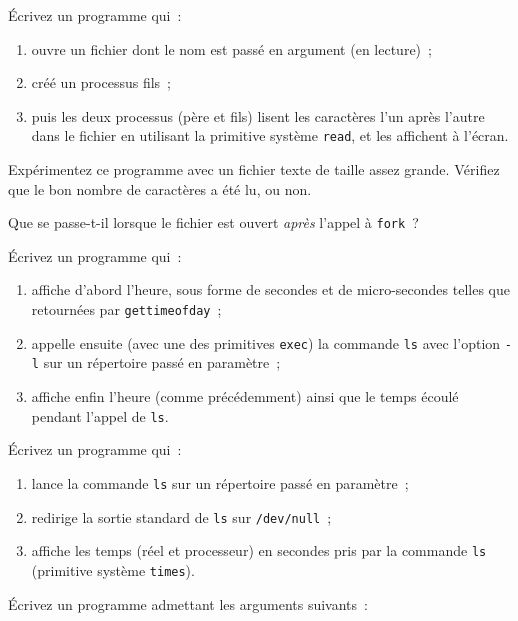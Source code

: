 Écrivez un programme qui~:
\begin {enumerate}
    \item ouvre un fichier dont le nom est passé en argument (en
	lecture)~;
    \item créé un processus fils~;
    \item puis les deux processus (père et fils) lisent les caractères
	l'un après l'autre dans le fichier en utilisant la primitive système
	{\tt read}, et les affichent à l'écran.
\end {enumerate}
Expérimentez ce programme avec un fichier texte de taille assez grande.
Vérifiez que le bon nombre de caractères a été lu, ou non.

Que se passe-t-il lorsque le fichier est ouvert {\em après} l'appel à
{\tt fork}~?


\question

Écrivez un programme qui~:

\begin {enumerate}
    \item affiche d'abord l'heure, sous forme de secondes et de
	micro-secondes telles que retournées par \texttt {gettimeofday}~;

    \item appelle ensuite (avec une des primitives \texttt {exec})
	la commande \texttt {ls} avec l'option \texttt {-l} sur un
	répertoire passé en paramètre~;

    \item affiche enfin l'heure (comme précédemment) ainsi que le
	temps écoulé pendant l'appel de \texttt {ls}.

\end {enumerate}


\question

Écrivez un programme qui~:

\begin {enumerate}
    \item lance la commande {\tt ls} sur un répertoire passé en
        paramètre~;
    \item redirige la sortie standard de {\tt ls} sur {\tt /dev/null}~;
    \item affiche les temps (réel et processeur) en secondes
	pris par la commande {\tt ls} (primitive système {\tt times}).
\end {enumerate}


\question

Écrivez un programme admettant les arguments suivants~:

